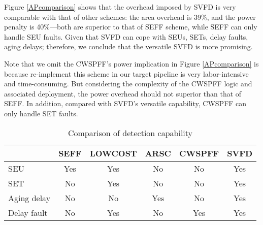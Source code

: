 Figure \ref{APcomparison} shows that the overhead imposed by SVFD is very comparable with that of other schemes: the area overhead is 39\%, and the power penalty is 40\%---both are superior to that of SEFF scheme, while SEFF can only handle SEU faults. Given that SVFD can cope with SEUs, SETs, delay faults, aging delays; therefore, we conclude that the versatile SVFD is more promising.

Note that we omit the CWSPFF's power implication in Figure \ref{APcomparison} is because re-implement this scheme in our target pipeline is very labor-intensive and time-consuming. But considering the complexity of the CWSPFF logic and associated deployment, the power overhead should not superior than that of SEFF. In addition, compared with SVFD's versatile capability, CWSPFF can only handle SET faults.


\begin{table}[t]
\begin{center}
  \setlength{\tabcolsep}{2mm}
\caption{Comparison of detection capability }\label{comparison}
\begin{tabular}{@{}lccccc}
  \toprule
    &  SEFF\cite{Mitra_C05}  &  LOWCOST\cite{lowcost_date07} &  ARSC\cite{agarwal2007circuit}  &  CWSPFF\cite{CWSP_DATE08}    &  SVFD \\
\midrule

            SEU        &  Yes   & Yes    & No     & No     & Yes  \\
            SET        &  No    & Yes    & No     & No     & Yes  \\
            Aging delay&  No    & No     & Yes    & No     & Yes  \\
            Delay fault&  No    & Yes    &  No    & Yes    & Yes  \\
\bottomrule %
\end{tabular}
\end{center}
\end{table}

